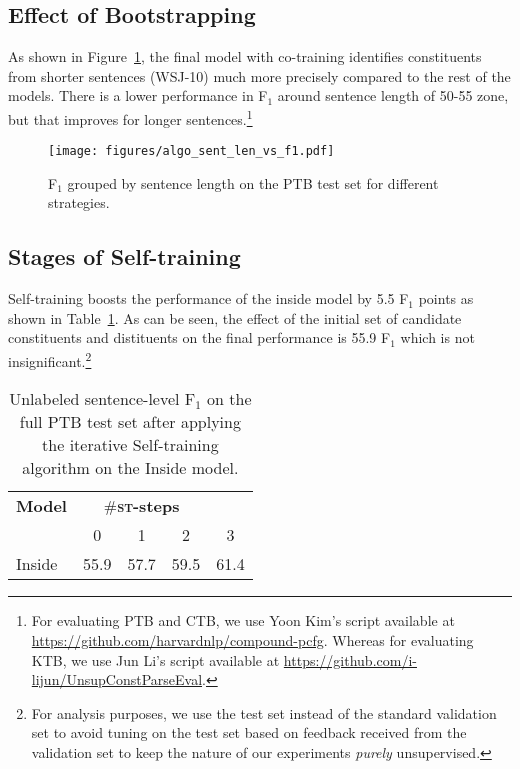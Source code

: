 \documentclass[11pt]{article}
\newcommand{\ptb}{\textsc{PTB}}
\newcommand{\ctb}{\textsc{CTB}}
\newcommand{\ktb}{\textsc{KTB}}
\begin{document}
\subsection{Effect of Bootstrapping}
As shown in Figure~\ref{fig:algo_sent_len_vs_f1}, the final model with co-training identifies constituents from shorter sentences (WSJ-10) much more precisely compared to the rest of the models. There is a lower performance in F$_1$ around sentence length of 50-55 zone, but that improves for longer sentences.\footnote{For evaluating \ptb{} and \ctb{}, we use Yoon Kim's script available at \url{https://github.com/harvardnlp/compound-pcfg}. Whereas for evaluating \ktb{}, we use Jun Li's script available at \url{https://github.com/i-lijun/UnsupConstParseEval}.}
\label{appx:bootstrapping-effect}
\begin{figure}[t]
   \centering
    \texttt{[image: figures/algo\_sent\_len\_vs\_f1.pdf]}
    \caption{F$_1$ grouped by sentence length on the \ptb{} test set for different strategies.}
    \label{fig:algo_sent_len_vs_f1}
\end{figure}

\subsection{Stages of Self-training}
\label{appx:stages-self-training}
Self-training boosts the performance of the inside model by 5.5 F$_1$ points as shown in Table~\ref{tab:self-training}. As can be seen, the effect of the initial set of candidate constituents and distituents on the final performance is 55.9 F$_1$ which is not insignificant.\footnote{For analysis purposes, we use the test set instead of the standard validation set to avoid tuning on the test set based on feedback received from the validation set to keep the nature of our experiments \emph{purely} unsupervised.}
\begin{table}[t]
    \centering
    \small
    \begin{tabular}{lcccc}
        \toprule
         \textbf{Model} & \multicolumn{3}{c}{ \#\textbf{{\textsc{st}}-steps}} \\
         & 0 & 1 & 2 & 3\\
        \midrule
         Inside & 55.9 & 57.7 & 59.5 & 61.4 \\
        \bottomrule
    \end{tabular}
    \caption{Unlabeled sentence-level F$_1$ on the full \ptb{} test set after applying the iterative Self-training algorithm on the Inside model.}
    \label{tab:self-training}
\end{table} 
\end{document}
